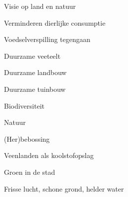 
\begin{voorstel}{Visie op land en natuur}\end{voorstel}

\begin{voorstel}{Verminderen dierlijke consumptie}\end{voorstel}
\begin{voorstel}{Voedselverspilling tegengaan}\end{voorstel}
\begin{voorstel}{Duurzame veeteelt}\end{voorstel}
\begin{voorstel}{Duurzame landbouw}\end{voorstel}
\begin{voorstel}{Duurzame tuinbouw}\end{voorstel}
\begin{voorstel}{Biodiversiteit}\end{voorstel}
\begin{voorstel}{Natuur}\end{voorstel}
\begin{voorstel}{(Her)bebossing}\end{voorstel}
\begin{voorstel}{Veenlanden als koolstofopslag}\end{voorstel}
\begin{voorstel}{Groen in de stad}\end{voorstel}
\begin{voorstel}{Frisse lucht, schone grond, helder water}\end{voorstel}